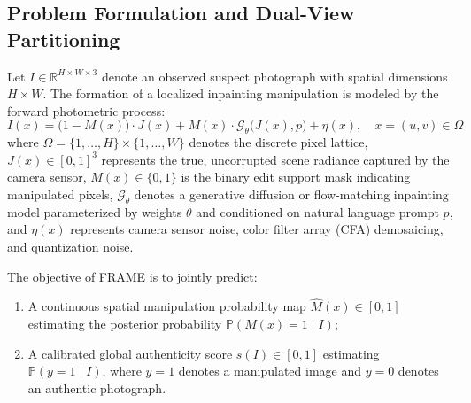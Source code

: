 \subsection{Problem Formulation and Dual-View Partitioning}
Let $I \in \mathbb{R}^{H \times W \times 3}$ denote an observed suspect photograph with spatial dimensions $H \times W$. The formation of a localized inpainting manipulation is modeled by the forward photometric process:
\begin{equation}
    I(x) = \big(1 - M(x)\big) \cdot J(x) + M(x) \cdot \mathcal{G}_\theta\big(J(x), p\big) + \eta(x), \quad x = (u, v) \in \Omega
    \label{eq:forward_model}
\end{equation}
where $\Omega = \{1, \dots, H\} \times \{1, \dots, W\}$ denotes the discrete pixel lattice, $J(x) \in [0, 1]^3$ represents the true, uncorrupted scene radiance captured by the camera sensor, $M(x) \in \{0, 1\}$ is the binary edit support mask indicating manipulated pixels, $\mathcal{G}_\theta$ denotes a generative diffusion or flow-matching inpainting model parameterized by weights $\theta$ and conditioned on natural language prompt $p$, and $\eta(x)$ represents camera sensor noise, color filter array (CFA) demosaicing, and quantization noise. 

The objective of FRAME is to jointly predict:
\begin{enumerate}
    \item A continuous spatial manipulation probability map $\hat{M}(x) \in [0, 1]$ estimating the posterior probability $\mathbb{P}(M(x) = 1 \mid I)$;
    \item A calibrated global authenticity score $s(I) \in [0, 1]$ estimating $\mathbb{P}(y = 1 \mid I)$, where $y = 1$ denotes a manipulated image and $y = 0$ denotes an authentic photograph.
\end{enumerate}

